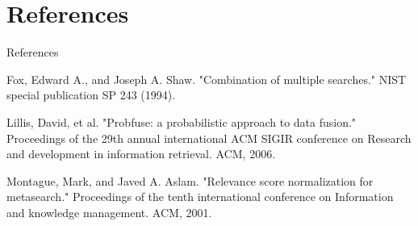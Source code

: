 \section{References}
\begin{frame}{References}
	\begin{tiny}
		\begin{thebibliography}{1}
			Fox, Edward A., and Joseph A. Shaw. "Combination of multiple searches." NIST special publication SP 243 (1994).

			Lillis, David, et al. "Probfuse: a probabilistic approach to data fusion." Proceedings of the 29th annual international ACM SIGIR conference on Research and development in information retrieval. ACM, 2006.
			
			Montague, Mark, and Javed A. Aslam. "Relevance score normalization for metasearch." Proceedings of the tenth international conference on Information and knowledge management. ACM, 2001.
		\end{thebibliography}
	\end{tiny}
\end{frame}
